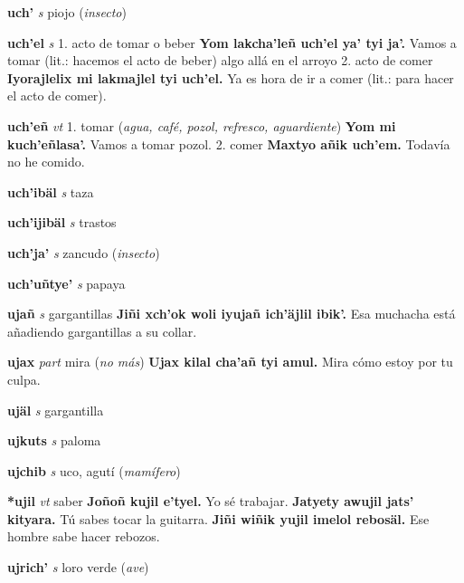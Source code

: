 \documentclass[10pt]{scrbook}
\newcommand{\entry}[1]{\textbf{#1}}
\newcommand{\onedefinition}[1]{#1.}
\newcommand{\partofspeech}[1]{\textit{#1}}
\newcommand{\spanishtranslation}[1]{#1}
\newcommand{\clarification}[1]{(\textit{#1})}
\newcommand{\cholexample}[1]{\textbf{#1}}
\newcommand{\exampletranslation}[1]{#1}
\begin{document}
\begin{multicols}{2}
\entry{uch'}
\partofspeech{s}
\spanishtranslation{piojo}
\clarification{insecto}

\entry{uch'el}
\partofspeech{s}
\onedefinition{1}
\spanishtranslation{acto de tomar o beber}
\cholexample{Yom lakcha'leñ uch'el ya' tyi ja'.}
\exampletranslation{Vamos a tomar (lit.: hacemos el acto de beber) algo allá en el arroyo}
\onedefinition{2}
\spanishtranslation{acto de comer}
\cholexample{Iyorajlelix mi lakmajlel tyi uch'el.}
\exampletranslation{Ya es hora de ir a comer (lit.: para hacer el acto de comer).}

\entry{uch'eñ}
\partofspeech{vt}
\onedefinition{1}
\spanishtranslation{tomar}
\clarification{agua, café, pozol, refresco, aguardiente}
\cholexample{Yom mi kuch'eñlasa'.}
\exampletranslation{Vamos a tomar pozol.}
\onedefinition{2}
\spanishtranslation{comer}
\cholexample{Maxtyo añik uch'em.}
\exampletranslation{Todavía no he comido.}

\entry{uch'ibäl}
\partofspeech{s}
\spanishtranslation{taza}

\entry{uch'ijibäl}
\partofspeech{s}
\spanishtranslation{trastos}

\entry{uch'ja'}
\partofspeech{s}
\spanishtranslation{zancudo}
\clarification{insecto}

\entry{uch'uñtye'}
\partofspeech{s}
\spanishtranslation{papaya}

\entry{ujañ}
\partofspeech{s}
\spanishtranslation{gargantillas}
\cholexample{Jiñi xch'ok woli iyujañ ich'äjlil ibik'.}
\exampletranslation{Esa muchacha está añadiendo gargantillas a su collar.}

\entry{ujax}
\partofspeech{part}
\spanishtranslation{mira}
\clarification{no más}
\cholexample{Ujax kilal cha'añ tyi amul.}
\exampletranslation{Mira cómo estoy por tu culpa.}

\entry{ujäl}
\partofspeech{s}
\spanishtranslation{gargantilla}

\entry{ujkuts}
\partofspeech{s}
\spanishtranslation{paloma}

\entry{ujchib}
\partofspeech{s}
\spanishtranslation{uco, agutí}
\clarification{mamífero}

\entry{*ujil}
\partofspeech{vt}
\spanishtranslation{saber}
\cholexample{Joñoñ kujil e'tyel.}
\exampletranslation{Yo sé trabajar.}
\cholexample{Jatyety awujil jats' kityara.}
\exampletranslation{Tú sabes tocar la guitarra.}
\cholexample{Jiñi wiñik yujil imelol rebosäl.}
\exampletranslation{Ese hombre sabe hacer rebozos.}

\entry{ujrich'}
\partofspeech{s}
\spanishtranslation{loro verde}
\clarification{ave}


\end{multicols}
\end{document}

